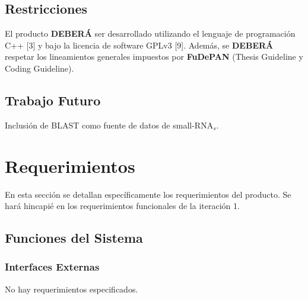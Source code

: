 \documentclass[12pt,a4paper,spanish]{article}
\begin{document}
\subsection{Restricciones}
	El producto \textbf{DEBERÁ} ser desarrollado utilizando el lenguaje de programación C++ [3] y bajo la licencia de software GPLv3 [9]. Además, se \textbf{DEBERÁ} respetar los lineamientos generales impuestos por \textbf{FuDePAN} (Thesis Guideline y Coding Guideline). 

\subsection{Trabajo Futuro}
	Inclusión de BLAST como fuente de datos de small-RNA$_s$.

\section{Requerimientos}
\label{section-req} 
En esta sección se detallan específicamente los requerimientos del producto. Se hará hincapié en los requerimientos funcionales de la iteración 1. 	

\subsection{Funciones del Sistema}

	\subsubsection{Interfaces Externas}
		No hay requerimientos especificados.
		
\end{document}
